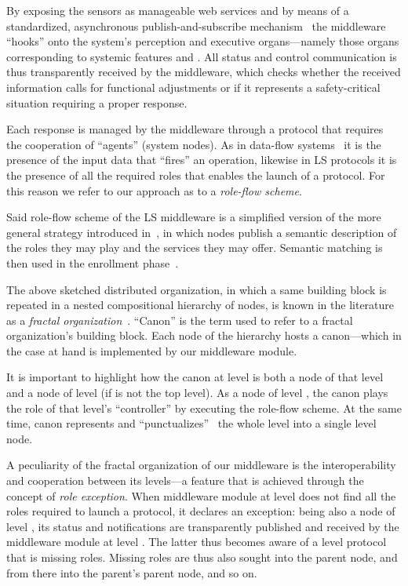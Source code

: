 \documentclass[twocolumn]{svjour3}
\def\M{\hbox{}}
\def\E{\hbox{}}
\begin{document}
By exposing the sensors as manageable web services and by means
of a standardized, asynchronous publish-and-subscribe mechanism~\cite{Oasis2} the
middleware ``hooks'' onto the system's perception and executive organs---namely
those organs corresponding to systemic features \M{} and \E.
All status and control communication is thus transparently received by the middleware, which 
checks whether the received information calls for functional adjustments or if it
represents a safety-critical situation requiring a proper response.

Each response is managed by the middleware
through a protocol that requires the cooperation of ``agents'' (system nodes).
As in data-flow systems~\cite{Sharp:1992:DFC:140762,Tom67}
it is the presence of the input data that ``fires'' an operation, likewise in LS protocols
it is the presence of all the required roles
that enables the launch of a protocol. For this reason we refer to our
approach as to a \emph{role-flow scheme}.

Said role-flow scheme of the LS middleware is a simplified version of the
more general strategy introduced in~\cite{DF13c,DeBl10},
in which nodes publish a semantic description of the roles they may play and the services they
may offer. Semantic matching is then used in the enrollment phase~\cite{SDB13a}.

The above sketched distributed organization, in which a same building block is repeated
in a nested compositional hierarchy of nodes,
is known in the literature as a \emph{fractal organization}~\cite{Koe67,Warnecke93,Tharu96,TWN1998}.
``Canon'' is the term used to refer to a fractal organization's building block.
Each node of the hierarchy hosts a canon---which in the case at hand is implemented by our middleware module.

It is important to highlight how the canon at level  is both a node of that level and
a node of level  (if  is not the top level). As a node of level , the canon
plays the role of that level's ``controller'' by executing the role-flow scheme.
At the same time, canon  represents and
``punctualizes''~\cite{Law92} the whole level  into a single level  node.

A peculiarity of the fractal organization of our middleware
is the interoperability and cooperation between its levels---a feature that is achieved through the concept of 
\emph{role exception}. When middleware module at level  does not find all the roles
required to launch a protocol, it declares
an exception: being also a node of level , its status and notifications are transparently
published and received by the middleware module at level . The latter thus becomes
aware of a level  protocol that is missing roles.
Missing roles are thus also sought into the parent node, and from there into the parent's parent node,
and so on.
\end{document}
